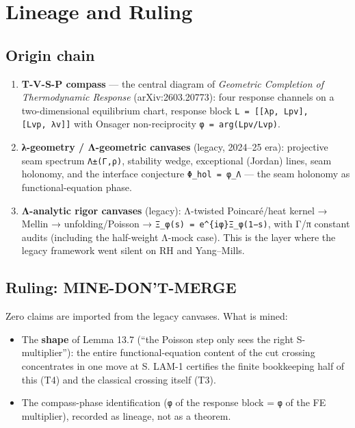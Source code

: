 \hypertarget{lineage-and-ruling}{%
\chapter{Lineage and Ruling}\label{lineage-and-ruling}}

\hypertarget{origin-chain}{%
\section{Origin chain}\label{origin-chain}}

\begin{enumerate}
\def\labelenumi{\arabic{enumi}.}
\tightlist
\item
  \textbf{T-V-S-P compass} --- the central diagram of \emph{Geometric Completion of
  Thermodynamic Response} (arXiv:2603.20773): four response channels on
  a two-dimensional equilibrium chart, response block
  \texttt{L\ =\ {[}{[}λp,\ Lpv{]},{[}Lvp,\ λv{]}{]}} with Onsager non-reciprocity
  \texttt{φ\ =\ arg(Lpv/Lvp)}.
\item
  \textbf{λ-geometry / Λ-geometric canvases} (legacy, 2024--25 era):
  projective seam spectrum \texttt{Λ±(Γ,ρ)}, stability wedge, exceptional
  (Jordan) lines, seam holonomy, and the interface conjecture
  \texttt{Φ\_hol\ =\ φ\_Λ} --- the seam holonomy as functional-equation phase.
\item
  \textbf{Λ-analytic rigor canvases} (legacy): Λ-twisted Poincaré/heat
  kernel → Mellin → unfolding/Poisson → \texttt{Ξ\_φ(s)\ =\ e\^{}\{iφ\}Ξ\_φ(1−s)},
  with Γ/π constant audits (including the half-weight Λ-mock case).
  This is the layer where the legacy framework went silent on RH and
  Yang--Mills.
\end{enumerate}

\hypertarget{ruling-mine-dont-merge}{%
\section{Ruling: MINE-DON'T-MERGE}\label{ruling-mine-dont-merge}}

Zero claims are imported from the legacy canvases. What is mined:

\begin{itemize}
\tightlist
\item
  The \textbf{shape} of Lemma 13.7 (``the Poisson step only sees the right
  S-multiplier''): the entire functional-equation content of the cut
  crossing concentrates in one move at S. LAM-1 certifies the finite
  bookkeeping half of this (T4) and the classical crossing itself (T3).
\item
  The compass-phase identification (\texttt{φ} of the response block = \texttt{φ} of
  the FE multiplier), recorded as lineage, not as a theorem.
\end{itemize}

